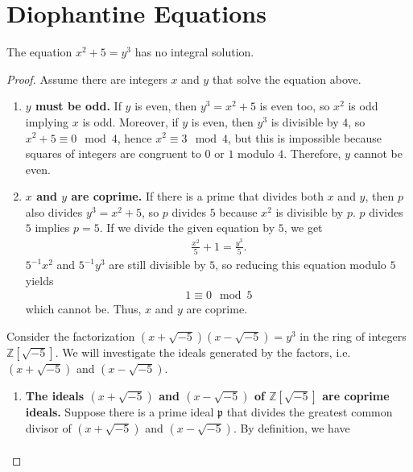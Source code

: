 \section*{Diophantine Equations}

\begin{example}
    The equation \(x^2 + 5 = y^3\) has no integral solution.
\end{example}
\begin{proof}
    Assume there are integers \(x\) and \(y\) that solve the equation above.
    \begin{enumerate}
        \item \textbf{\(y\) must be odd.} If \(y\) is even, then \(y^3 = x^2 + 5\) is even too, so \(x^2\) is odd implying \(x\) is odd. Moreover, if \(y\) is even, then \(y^3\) is divisible by \(4\), so \(x^2 + 5 \equiv 0 \mod{4}\), hence \(x^2 \equiv 3 \mod{4}\), but this is impossible because squares of integers are congruent to \(0\) or \(1\) modulo \(4\). Therefore, \(y\) cannot be even.
        \item \textbf{\(x\) and \(y\) are coprime.} If there is a prime that divides both \(x\) and \(y\), then \(p\) also divides \(y^3 = x^2 + 5\), so \(p\) divides \(5\) because \(x^2\) is divisible by \(p\). \(p\) divides \(5\) implies \(p = 5\). If we divide the given equation by \(5\), we get
        \begin{align*}
            \frac{x^2}{5} + 1 = \frac{y^3}{5} \text{.}
        \end{align*}
        \(5^{-1} x^2\) and \(5^{-1} y^3\) are still divisible by \(5\), so reducing this equation modulo \(5\) yields
        \begin{align*}
            1 \equiv 0 \mod{5}
        \end{align*}
        which cannot be. Thus, \(x\) and \(y\) are coprime.
    \end{enumerate}
    Consider the factorization \((x + \sqrt{-5})(x - \sqrt{-5}) = y^3\) in the ring of integers \(\mathbb{Z}[\sqrt{-5}]\). We will investigate the ideals generated by the factors, i.e. \((x + \sqrt{-5})\) and \((x - \sqrt{-5})\).
    \begin{enumerate}[resume]
        \item \textbf{The ideals \((x + \sqrt{-5})\) and \((x - \sqrt{-5})\) of \(\mathbb{Z}[\sqrt{-5}]\) are coprime ideals.} Suppose there is a prime ideal \(\mathfrak{p}\) that divides the greatest common divisor of \((x + \sqrt{-5})\) and \((x - \sqrt{-5})\). By definition, we have
        \begin{align*}

\end{align*}
\end{enumerate}
\end{proof}
